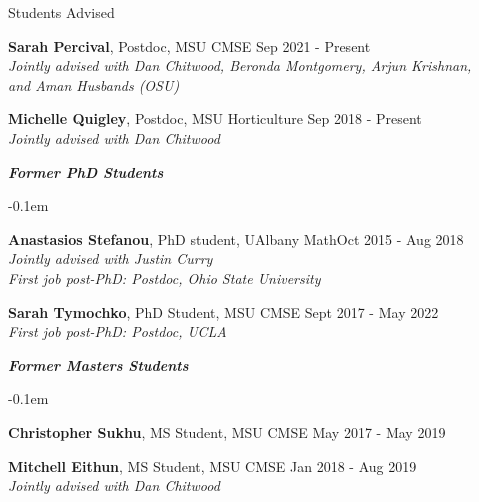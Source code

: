\documentclass{resume} %
\begin{document}
\begin{rSection}{Students Advised}
\begin{list}{}{\leftmargin=1em}
   \item \textbf{Sarah Percival}, Postdoc, MSU CMSE \hfill Sep 2021 - Present\\
   \phantom{XXX} \textit{Jointly advised with Dan Chitwood, Beronda Montgomery, Arjun Krishnan,}\\
   \phantom{XXX} \textit{and Aman Husbands (OSU)}

   \item \textbf{Michelle Quigley}, Postdoc, MSU Horticulture \hfill Sep 2018 - Present\\
   \phantom{XXX} \textit{Jointly advised with Dan Chitwood}

\end{list}

\textbf{\textit{Former PhD Students}}
\begin{list}{}{\leftmargin=1em}
   \itemsep -0.1em %


   \item \textbf{Anastasios Stefanou}, PhD student, UAlbany Math\hfill Oct 2015 - Aug 2018
\\
   \phantom{XXX} \textit{Jointly advised with Justin Curry}
\\
   \phantom{XXX} \textit{First job post-PhD: Postdoc, Ohio State University}


   \item \textbf{Sarah Tymochko}, PhD Student, MSU CMSE \hfill Sept 2017 - May 2022
\\
   \phantom{XXX} \textit{First job post-PhD: Postdoc, UCLA}
 \end{list}

\textbf{\textit{Former Masters Students}}
\begin{list}{}{\leftmargin=1em}
   \itemsep -0.1em %

   \item \textbf{Christopher Sukhu}, MS Student, MSU CMSE \hfill May 2017 - May 2019

   \item \textbf{Mitchell Eithun}, MS Student, MSU CMSE \hfill Jan 2018 - Aug 2019
\\
   \phantom{XXX} \textit{Jointly advised with Dan Chitwood}





\end{list}
\end{rSection}
\end{document}
